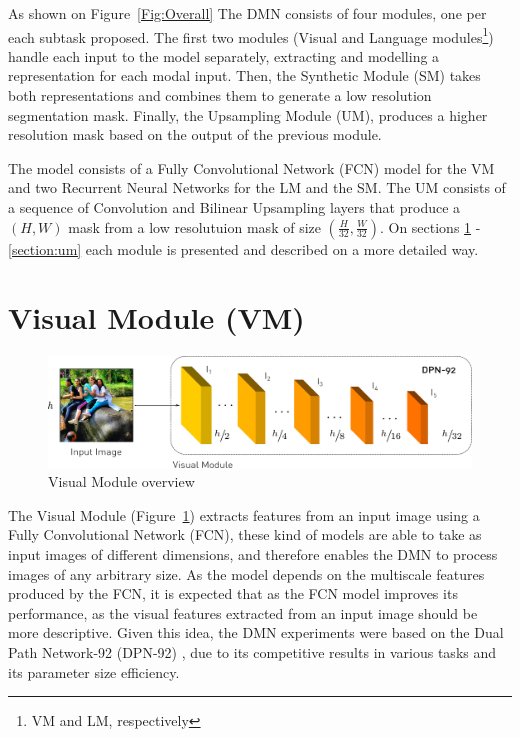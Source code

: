 As shown on Figure~\ref{Fig:Overall} The DMN consists of four modules, one per each subtask proposed. The first two modules (Visual and Language modules\footnote{VM and LM, respectively}) handle each input to the model separately, extracting and modelling a representation for each modal input. Then, the Synthetic Module (SM) takes both representations and combines them to generate a low resolution segmentation mask. Finally, the Upsampling Module (UM), produces a higher resolution mask based on the output of the previous module.

The model consists of a Fully Convolutional Network (FCN) model for the VM and two Recurrent Neural Networks for the LM and the SM. The UM consists of a sequence of Convolution and Bilinear Upsampling layers that produce a $(H, W)$ mask from a low resolutuion mask of size $(\frac{H}{32}, \frac{W}{32})$. On sections \ref{section:vm} - \ref{section:um} each module is presented and described on a more detailed way.

\section{Visual Module (VM)}
\label{section:vm}

\begin{figure}
\centering
\includegraphics[width=\textwidth]{./figures/Visual_Module.pdf}
\caption{Visual Module overview}
\label{Fig:VM}
\end{figure}


The Visual Module (Figure~\ref{Fig:VM}) extracts features from an input image using a Fully Convolutional Network (FCN), these kind of models are able to take as input images of different dimensions, and therefore enables the DMN to process images of any arbitrary size. As the model depends on the multiscale features produced by the FCN, it is expected that as the FCN model improves its performance, as the visual features extracted from an input image should be more descriptive. Given this idea, the DMN experiments were based on the Dual Path Network-92 (DPN-92) \cite{DBLP:journals/corr/ChenLXJYF17}, due to its competitive results in various tasks and its parameter size efficiency.

